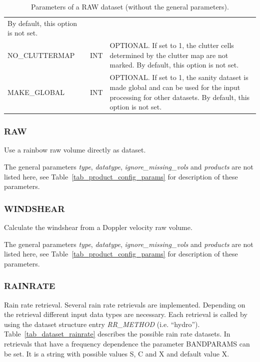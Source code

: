 \documentclass[a4paper,11pt,pdftex,twoside]{scrartcl}
\begin{document}
{{{\begin{table}[H]
\begin{tabularx}{\textwidth}{llX}
                         By default, this option is not set.\\
NO\_CLUTTERMAP   & INT & OPTIONAL. If set to 1, the clutter cells determined by the clutter
                         map are not marked. By default, this option is not set.\\
MAKE\_GLOBAL     & INT & OPTIONAL. If set to 1, the sanity dataset is made global and can be
                         used for the input processing for other datasets.
                         By default, this option is not set.\\
\end{tabularx}
\caption{Parameters of a RAW dataset (without the general parameters).}
\label{tab_dataset_san}
\end{table}

\subsubsection{RAW}
\label{subsec_raw}

Use a rainbow raw volume directly as dataset.

The general parameters \emph{type}, \emph{datatype}, \emph{ignore\_missing\_vols}
and \emph{products} are not listed here, see Table~\ref{tab_product_config_params} for
description of these parameters.

\subsubsection{WINDSHEAR}
\label{subsec_windshear}

Calculate the windshear from a Doppler velocity raw volume.

The general parameters \emph{type}, \emph{datatype}, \emph{ignore\_missing\_vols}
and \emph{products} are not listed here, see Table~\ref{tab_product_config_params} for
description of these parameters.

\subsubsection{RAINRATE}
\label{subsec_rainrate}
Rain rate retrieval. Several rain rate retrievals are implemented. Depending on the retrieval different input data types are necessary. Each retrieval is called by using the dataset structure entry \emph{RR\_METHOD} (i.e. ``hydro''). Table~\ref{tab_dataset_rainrate} describes the possible rain rate datasets. In retrievals that have a frequency dependence the parameter BANDPARAMS can be set. It is a string with possible values S, C and X and default value X.

}}}
\end{document}
